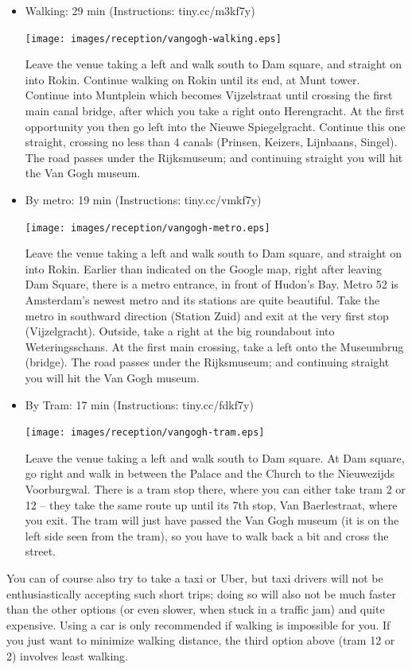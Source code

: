 \begin{itemize}
\item Walking: 29 min (Instructions: tiny.cc/m3kf7y)

\texttt{[image: images/reception/vangogh-walking.eps]} 

Leave the venue taking a left and walk south to Dam square, and straight on into Rokin. Continue walking on Rokin until its end, at Munt tower. Continue into Muntplein which becomes Vijzelstraat until crossing the first main canal bridge, after which you take a right onto Herengracht. At the first opportunity you then go left into the Nieuwe Spiegelgracht. Continue this one straight, crossing no less than 4 canals (Prinsen, Keizers, Lijnbaans, Singel). The road passes under the Rijksmuseum; and continuing straight you will hit the Van Gogh museum.

\item By metro: 19 min (Instructions: tiny.cc/vmkf7y)

\texttt{[image: images/reception/vangogh-metro.eps]}

Leave the venue taking a left and walk south to Dam square, and straight on into Rokin. Earlier than indicated on the Google map, right after leaving Dam Square, there is a metro entrance, in front of Hudon's Bay. Metro 52 is Amsterdam's newest metro and its stations are quite beautiful. Take the metro in southward direction (Station Zuid) and exit at the very first stop (Vijzelgracht). Outside, take a right at the big roundabout into Weteringsschans. At the first main crossing, take a left onto the Museumbrug (bridge). The road passes under the Rijksmuseum; and continuing straight you will hit the Van Gogh museum.

\item By Tram: 17 min (Instructions: tiny.cc/fdkf7y)

\texttt{[image: images/reception/vangogh-tram.eps]}

Leave the venue taking a left and walk south to Dam square. At Dam square, go right and walk in between the Palace and the Church to the Nieuwezijds Voorburgwal. There is a tram stop there, where you can either take tram 2 or 12  -- they take the same route up until its 7th stop, Van Baerlestraat, where you exit. The tram will just have passed the Van Gogh museum (it is on the left side seen from the tram), so you have to walk back a bit and cross the street.
\end{itemize}

You can of course also try to take a taxi or Uber, but taxi drivers will not be enthusiastically accepting such short trips; doing so will also not be much faster than the other options (or even slower, when stuck in a traffic jam) and quite expensive. Using a car is only recommended if walking is impossible for you. If you just want to minimize walking distance, the third option above (tram 12 or 2) involves least walking.

